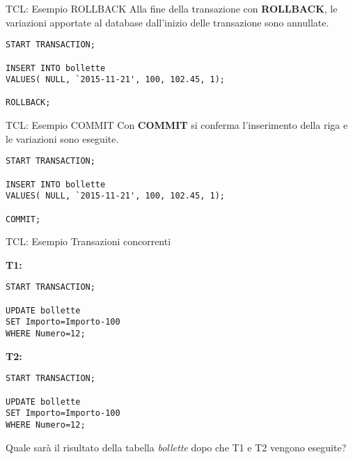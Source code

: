 %
\begin{frame}[fragile]{TCL: Esempio ROLLBACK}
Alla fine della transazione con \textbf{ROLLBACK}, le variazioni apportate al database dall'inizio delle transazione sono annullate.
\begin{lstlisting}
START TRANSACTION;

INSERT INTO bollette
VALUES( NULL, `2015-11-21', 100, 102.45, 1);

ROLLBACK;
\end{lstlisting}
\end{frame}
%
\begin{frame}[fragile]{TCL: Esempio COMMIT}
Con \textbf{COMMIT} si conferma l'inserimento della riga e le variazioni sono eseguite.
\begin{lstlisting}
START TRANSACTION;

INSERT INTO bollette
VALUES( NULL, `2015-11-21', 100, 102.45, 1);

COMMIT;
\end{lstlisting}
\end{frame}
%
\begin{frame}[fragile]{TCL: Esempio Transazioni concorrenti}
\begin{minipage}[t]{0.48\linewidth}
\textbf{T1:}
\begin{lstlisting}
START TRANSACTION;

UPDATE bollette
SET Importo=Importo-100
WHERE Numero=12;
\end{lstlisting}
\end{minipage}%
\hfill%
\begin{minipage}[t]{0.48\linewidth}
\textbf{T2:}
\begin{lstlisting}
START TRANSACTION;

UPDATE bollette
SET Importo=Importo-100
WHERE Numero=12;
\end{lstlisting}
\end{minipage}
\vspace{.9cm}

Quale sar\`a il risultato della tabella \textit{bollette} dopo che T1 e T2 vengono eseguite?
\end{frame}
%
